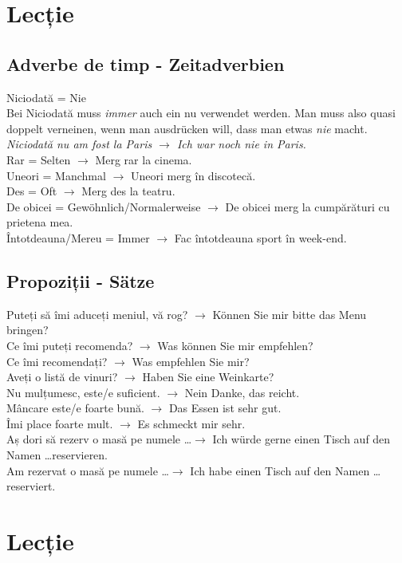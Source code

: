 \documentclass[11pt, oneside]{article}
\begin{document}
\pagebreak
\section{Lecție}
\subsection{Adverbe de timp - Zeitadverbien}
Niciodată = Nie\\
Bei Niciodată muss \emph{immer} auch ein nu verwendet werden. Man muss also quasi 
doppelt verneinen, wenn man ausdrücken will, dass man etwas \emph{nie} macht.\\
\emph{Niciodată nu am fost la Paris $\rightarrow$ Ich war noch nie in Paris.}\\
\newline
Rar = Selten $\rightarrow$ Merg rar la cinema.\\
Uneori = Manchmal $\rightarrow$ Uneori merg în discotecă.\\
Des = Oft $\rightarrow$ Merg des la teatru.\\
De obicei = Gewöhnlich/Normalerweise $\rightarrow$ De obicei merg la cumpărături cu prietena mea.\\
Întotdeauna/Mereu = Immer $\rightarrow$ Fac întotdeauna sport în week-end.
\subsection{Propoziții - Sätze}
Puteți să îmi aduceți meniul, vă rog? $\rightarrow$ Können Sie mir bitte das Menu bringen?\\
Ce îmi puteți recomenda? $\rightarrow$ Was können Sie mir empfehlen?\\
Ce îmi recomendați? $\rightarrow$ Was empfehlen Sie mir?\\
Aveți o listă de vinuri? $\rightarrow$ Haben Sie eine Weinkarte?\\
Nu mulțumesc, este/e suficient. $\rightarrow$ Nein Danke, das reicht.\\
Mâncare este/e foarte bună. $\rightarrow$ Das Essen ist sehr gut.\\
Îmi place foarte mult. $\rightarrow$ Es schmeckt mir sehr.\\
Aș dori să rezerv o masă pe numele \dots $\rightarrow$ Ich würde gerne einen Tisch auf den Namen \dots reservieren.\\
Am rezervat o masă pe numele \dots $\rightarrow$ Ich habe einen Tisch auf den Namen \dots reserviert.
\pagebreak
\section{Lecție}
\end{document}
